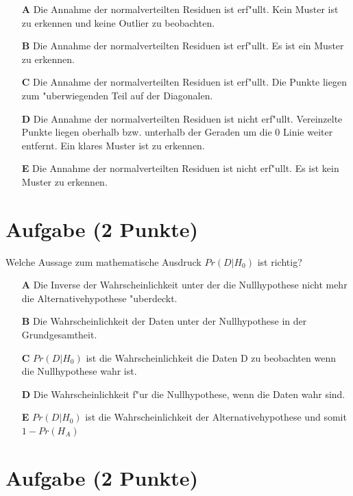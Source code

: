 \documentclass[a4paper, 10pt]{scrartcl}\usepackage[]{graphicx}\usepackage[]{xcolor}
\begin{document}
\begin{enumerate}
\item [\textbf{A} \msquare] Die Annahme der normalverteilten Residuen ist erf{"u}llt. Kein Muster ist zu erkennen und keine Outlier zu beobachten.
\item [\textbf{B} \msquare] Die Annahme der normalverteilten Residuen ist erf{"u}llt. Es ist ein Muster zu erkennen.
\item [\textbf{C} \msquare] Die Annahme der normalverteilten Residuen ist erf{"u}llt. Die Punkte liegen zum {"u}berwiegenden Teil auf der Diagonalen.
\item [\textbf{D} \msquare] Die Annahme der normalverteilten Residuen ist nicht erf{"u}llt. Vereinzelte Punkte liegen oberhalb bzw. unterhalb der Geraden um die 0 Linie weiter entfernt. Ein klares Muster ist zu erkennen.
\item [\textbf{E} \msquare] Die Annahme der normalverteilten Residuen ist nicht erf{"u}llt. Es ist kein Muster zu erkennen.
\end{enumerate}

\section{Aufgabe \hfill (2 Punkte)}

Welche Aussage zum mathematische Ausdruck $Pr(D|H_0)$ ist richtig? 



\begin{enumerate}
\item [\textbf{A} \msquare] Die Inverse der Wahrscheinlichkeit unter der die Nullhypothese nicht mehr die Alternativehypothese {"u}berdeckt.
\item [\textbf{B} \msquare] Die Wahrscheinlichkeit der Daten unter der Nullhypothese in der Grundgesamtheit.
\item [\textbf{C} \msquare] $Pr(D|H_0)$ ist die Wahrscheinlichkeit die Daten D zu beobachten wenn die Nullhypothese wahr ist.
\item [\textbf{D} \msquare] Die Wahrscheinlichkeit f{"u}r die Nullhypothese, wenn die Daten wahr sind.
\item [\textbf{E} \msquare] $Pr(D|H_0)$ ist die Wahrscheinlichkeit der Alternativehypothese und somit $1 - Pr(H_A)$
\end{enumerate}

\section{Aufgabe \hfill (2 Punkte)}
\end{document}
